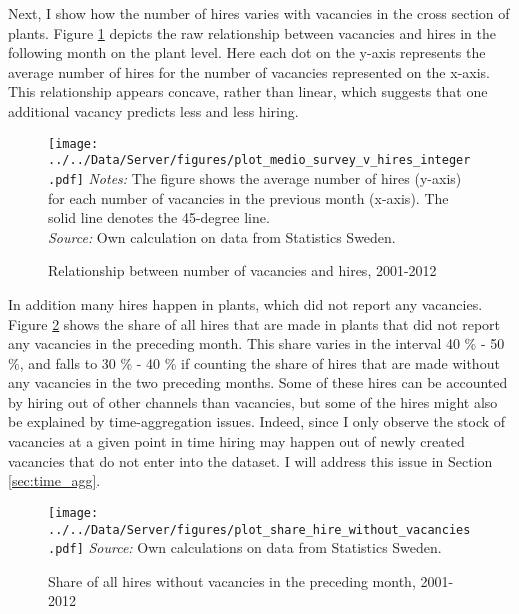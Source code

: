 Next, I show how the number of hires varies with vacancies in the cross section of plants. Figure \ref{fig:crossplot} depicts the raw relationship between vacancies and hires in the following month on the plant level. Here each dot on the y-axis represents the average number of hires for the number of vacancies represented on the x-axis. This relationship appears concave, rather than linear, which suggests that one additional vacancy predicts less and less hiring. %

\begin{figure}[t]
\centering
\caption{Relationship between number of vacancies and hires, 2001-2012}
\texttt{[image: ../../Data/Server/figures/plot\_medio\_survey\_v\_hires\_integer.pdf]}
\flushleft
\footnotesize{\emph{Notes:} The figure shows the average number of hires (y-axis) for each number of vacancies in the previous month (x-axis). The solid line denotes the 45-degree line.} \\
\footnotesize{\emph{Source:} Own calculation on data from Statistics Sweden.}
\label{fig:crossplot}
\end{figure}

In addition many hires happen in plants, which did not report any vacancies. Figure \ref{fig:share_without} shows the share of all hires that are made in plants that did not report any vacancies in the preceding month. This share varies in the interval 40 \% - 50 \%, and falls to 30 \% - 40 \% if counting the share of hires that are made without any vacancies in the two preceding months. Some of these hires can be accounted by hiring out of other channels than vacancies, but some of the hires might also be explained by time-aggregation issues. Indeed, since I only observe the stock of vacancies at a given point in time hiring may happen out of newly created vacancies that do not enter into the dataset. I will address this issue in Section \ref{sec:time_agg}.

\begin{figure}[t]
\centering
\caption{Share of all hires without vacancies in the preceding month, 2001-2012}
\texttt{[image: ../../Data/Server/figures/plot\_share\_hire\_without\_vacancies.pdf]}
\flushleft
\footnotesize{\emph{Source:} Own calculations on data from Statistics Sweden.}
\label{fig:share_without}
\end{figure}

